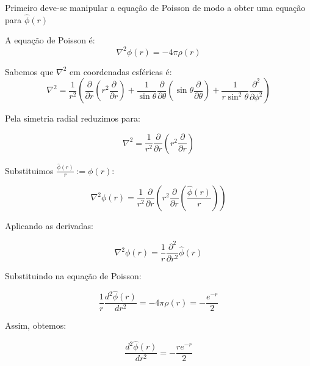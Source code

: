 \documentclass[12pt, a4paper]{article} %
\begin{document}
        Primeiro deve-se manipular a equa\c{c}\~ao de Poisson de modo a obter uma equa\c{c}\~ao para $\hat{\phi}(r)$

        A equa\c{c}\~ao de Poisson \'e:
        \begin{equation*}
            \nabla^{2} \phi(r) = -4\pi \rho(r)
        \end{equation*}

        Sabemos que $\nabla^{2}$ em coordenadas esf\'ericas \'e:
        \begin{equation*}
            \nabla^{2} = \frac{1}{r^{2}} \left( \frac{\partial}{\partial r} \left( r^{2} \frac{\partial}{\partial r} \right) + \frac{1}{\sin \theta}\frac{\partial}{\partial \theta} \left( \sin \theta \frac{\partial}{\partial \theta} \right) + \frac{1}{r \sin^{2} \theta} \frac{\partial^{2}}{\partial \phi^{2}} \right)
        \end{equation*}

        Pela simetria radial reduzimos  para:

        \begin{equation*}
            \nabla^{2} = \frac{1}{r^{2}} \frac{\partial}{\partial r} \left( r^{2} \frac{\partial}{\partial r} \right)
        \end{equation*}

        Substituimos $\frac{\hat{\phi}(r)}{r} := \phi(r)$:

        \begin{equation*}
            \nabla^{2} \phi(r) = \frac{1}{r^{2}} \frac{\partial}{\partial r} \left( r^{2} \frac{\partial}{\partial r} \left( \frac{\hat{\phi}(r)}{r} \right) \right)
        \end{equation*}

        Aplicando as derivadas:

        \begin{equation*}
            \nabla^{2} \phi(r) = \frac{1}{r}\frac{\partial^{2}}{\partial r^{2}} \hat{\phi}(r)
        \end{equation*}

        Substituindo na equa\c{c}\~ao de Poisson:

        \begin{equation*}
            \frac{1}{r} \frac{d^{2} \hat{\phi}(r)}{dr^{2}} = -4\pi \rho(r) = -\frac{e^{-r}}{2}
        \end{equation*}

        Assim, obtemos:

        \begin{equation*}
            \frac{d^{2} \hat{\phi}(r)}{dr^{2}} = -\frac{re^{-r}}{2}
        \end{equation*}
\end{document}
